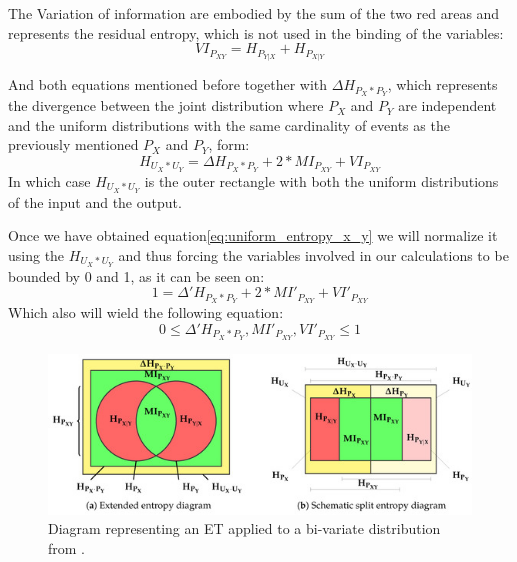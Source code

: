 The Variation of information are embodied by the sum of the two red areas and represents the residual entropy, which is not used in the binding of the variables:
% 
\begin{equation}\label{eq:virtual_information}
VI_{P_{XY}} = H_{P_{Y|X}} + H_{P_{X|Y}}
\end{equation}

And both equations mentioned before together with $\Delta H_{P_{X} * P_{Y}}$, which represents the divergence between the joint distribution where $P_X$ and $P_Y$ are independent and the uniform distributions with the same cardinality of events as the previously mentioned $P_X$ and $P_Y$, form:
%
\begin{equation}\label{eq:uniform_entropy_x_y}
H_{U_{X} * U_{Y}} = \Delta H_{P_{X} * P_{Y}} + 2 * MI_{P_{XY}} + VI_{P_{XY}}
\end{equation}
%
In which case $H_{U_{X} * U_{Y}}$ is the outer rectangle with both the uniform distributions of the input and the output.

Once we have obtained equation\ref{eq:uniform_entropy_x_y} we will normalize it using the  $H_{U_{X} * U_{Y}}$ and thus forcing the variables involved in our calculations to be bounded by 0 and 1, as it can be seen on:
%
\begin{equation}\label{eq:normalised_uniformed}
1 = \Delta'H_{P_{X} * P_{Y}} + 2 * MI'_{P_{XY}} + VI'_{P_{XY}} 
\end{equation}
Which also will wield the following equation:
\begin{equation}\label{eq:complex_space_equation}
0 \leq \Delta'H_{P_{X} * P_{Y}}, MI'_{P_{XY}}, VI'_{P_{XY}}  \leq 1
\end{equation}
\newline
\begin{figure}[H]
 \centering
  \includegraphics[width=14cm]{Figuras_tfg/ET_Diagram}
  \caption{Diagram representing an ET applied to a bi-variate distribution from \cite{val:pel:18c}.}
 \label{fig:figure_diagram_et}
\end{figure} 


